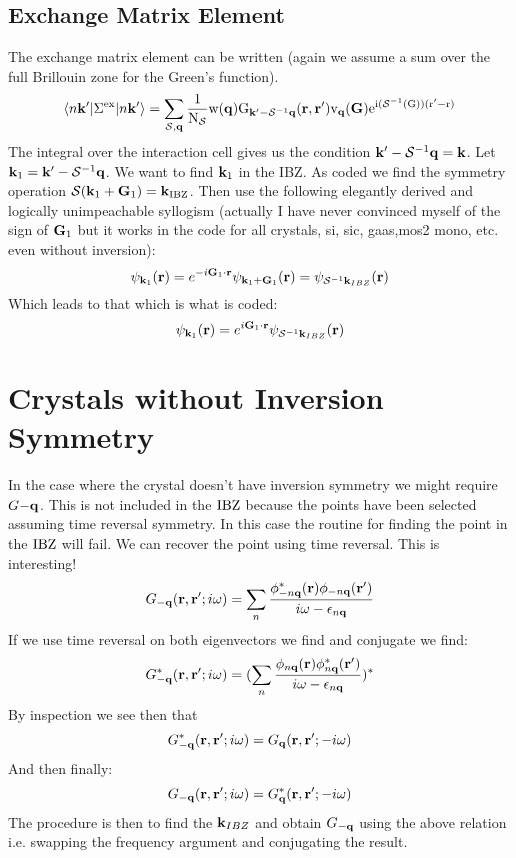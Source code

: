 \documentclass{article}
\def\r{{\bf r}}
\def\k{{\bf k}}
\def\q{{\bf q}}
\def\G{{\bf G}}
\def\S{\mathcal{S}}
\def\bra{\langle}
\def\ket{\rangle}
\begin{document}
\subsection{Exchange Matrix Element}
The exchange matrix element can be written (again we assume a sum over the full Brillouin zone for the Green's function).
%
\begin{equation}
\bra n\k'|\Sigma^{{\rm ex}}|n\k'\ket = \sum_{\S,\q} \frac{1}{\rm{N}_{\S}}\rm{w}(\q)G_{\k'-\S^{-1}\q}(\r,\r')v_{\q}(\G)e^{i(\S^{-1}(G))(r'-r)}
\end{equation}
%
The integral over the interaction cell gives us the condition $\k'-\S^{-1}\q = \k$.
%
Let $\k_{1}=\k'-\S^{-1}\q$. We want to find $\k_{1}$ in the IBZ.
%
As coded we find the symmetry operation $\S(\k_{1}+\G_{1})= \k_{\rm IBZ}$.
%
Then use the following elegantly derived and logically unimpeachable syllogism (actually I have never convinced
myself of the sign of $\G_{1}$ but it works in the code for all crystals, si, sic, gaas,mos2 mono, etc. even without inversion):
%
\begin{equation}
\psi_{\k_{1}}(\r) = e^{-i\G_{1}\cdot\r}\psi_{\k_{1}+\G_{1}}(\r) = \psi_{\S^{-1}\k_{IBZ}}(\r)
\end{equation}
%
Which leads to that which is what is coded:
%
\begin{equation}
\psi_{\k_{1}}(\r) = e^{i\G_{1}\cdot\r}\psi_{\S^{-1}\k_{IBZ}}(\r)
\end{equation}
%
\section{Crystals without Inversion Symmetry}
%
In the case where the crystal doesn't have inversion symmetry we might require $G{-\q}$. 
This is not included in the ${\rm IBZ}$ because the points have been selected assuming 
time reversal symmetry. In this case the routine for finding the point in the ${\rm IBZ}$ will fail.
We can recover the point using time reversal. This is interesting!
%
\begin{equation}
G_{-\q}(\r,\r';i\omega) = \sum_{n} \frac{\phi_{-n\q}^{*}(\r)\phi_{-n\q}(\r')}{i\omega - \epsilon_{n\q}}
\end{equation}
%
If we use time reversal on both eigenvectors we find and conjugate we find:
%
\begin{equation}
G^{*}_{-\q}(\r,\r';i\omega) = (\sum_{n} \frac{\phi_{n\q}(\r)\phi_{n\q}^{*}(\r')}{i\omega - \epsilon_{n\q}})^{*}
\end{equation}
%
By inspection we see then that
%
\begin{equation}
G^{*}_{-\q}(\r,\r';i\omega) = G_{\q}(\r,\r';-i\omega) 
\end{equation}
%
And then finally:
%
\begin{equation}
G_{-\q}(\r,\r';i\omega) = G^{*}_{\q}(\r,\r';-i\omega) 
\end{equation}
%
The procedure is then to find the $\k_{IBZ}$ and obtain $G_{-\q}$ using the above relation i.e.
swapping the frequency argument and conjugating the result. 
\end{document}
